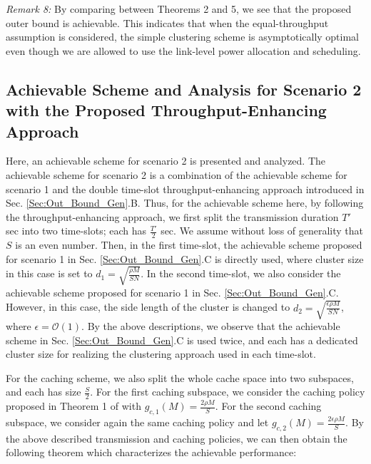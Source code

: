 \documentclass[journal,draftclsnofoot,onecolumn,12pt,twoside]{IEEEtran}
\begin{document}
{\em Remark 8:} By comparing between Theorems 2 and 5, we see that the proposed outer bound is achievable. This indicates that when the equal-throughput assumption is considered, the simple clustering scheme is asymptotically optimal even though we are allowed to use the link-level power allocation and scheduling.

\subsection{Achievable Scheme and Analysis for Scenario 2 with the Proposed Throughput-Enhancing Approach}

Here, an achievable scheme for scenario 2 is presented and analyzed. The achievable scheme for scenario 2 is a combination of the achievable scheme for scenario 1 and the double time-slot throughput-enhancing approach introduced in Sec. \ref{Sec:Out_Bound_Gen}.B. Thus, for the achievable scheme here, by following the throughput-enhancing approach, we first split the transmission duration $T'$ sec into two time-slots; each has $\frac{T'}{2}$ sec. We assume without loss of generality that $S$ is an even number. Then, in the first time-slot, the achievable scheme proposed for scenario 1 in Sec. \ref{Sec:Out_Bound_Gen}.C is directly used, where cluster size in this case is set to $d_1=\sqrt{\frac{\rho M}{SN}}$. In the second time-slot, we also consider the achievable scheme proposed for scenario 1 in Sec. \ref{Sec:Out_Bound_Gen}.C. However, in this case, the side length of the cluster is changed to $d_2=\sqrt{\frac{\epsilon\rho M}{SN}}$, where $\epsilon=\mathcal{O}(1)$. By the above descriptions, we observe that the achievable scheme in Sec. \ref{Sec:Out_Bound_Gen}.C is used twice, and each has a dedicated cluster size for realizing the clustering approach used in each time-slot.

For the caching scheme, we also split the whole cache space into two subspaces, and each has size $\frac{S}{2}$. For the first caching subspace, we consider the caching policy proposed in Theorem 1 of \cite{lee2020optimal} with $g_{c,1}(M)=\frac{2\rho M}{S}$. For the second caching subspace, we consider again the same caching policy and let $g_{c,2}(M)=\frac{2\epsilon\rho M}{S}$. By the above described transmission and caching policies, we can then obtain the following theorem which characterizes the achievable performance:
\end{document}
